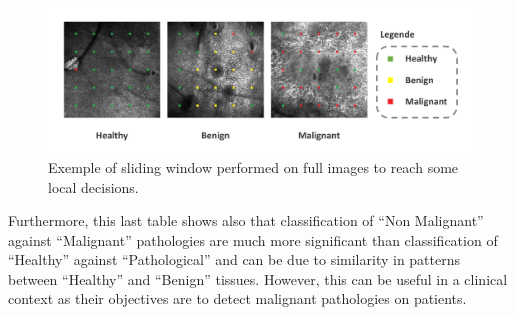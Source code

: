 \begin{figure}[h]
    \begin{center} 
        \includegraphics[width=\linewidth]{content/figures/Detection.pdf}
        \caption{Exemple of sliding window performed on full images to reach some local decisions.}
        \label{detection}
    \end{center} 
\end{figure}
Furthermore, this last table shows also that classification of “Non Malignant” against “Malignant” pathologies are much more significant than classification of “Healthy” against “Pathological” and can be due to similarity in patterns between “Healthy” and “Benign” tissues. However, this can be useful in a clinical context as their objectives are to detect malignant pathologies on patients.
